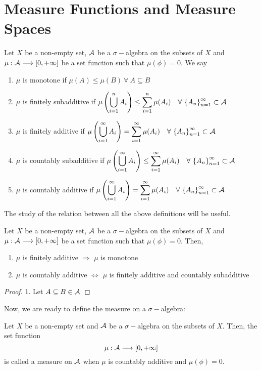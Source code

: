 \documentclass[a4paper]{book}
\begin{document}
\section{Measure Functions and Measure Spaces}
\begin{definition}
Let $X$ be a non-empty set, $\mathcal{A}$ be a $\sigma-$algebra on the subsets of $X$ and $\mu: \mathcal{A} \longrightarrow [0, +\infty]$ be a set function such that $\mu(\phi) = 0$. We say
\begin{enumerate}
\item $\displaystyle \mu$ is monotone if $\mu(A) \leq \mu(B)\ \forall\ A \subseteq B$
\item $\mu$ is finitely subadditive if $\displaystyle \mu \left( \bigcup_{i=1}^n A_i \right) \leq \sum_{i=1}^n \mu(A_i)\quad \forall\ \qty{A_n}_{n=1}^\infty \subset \mathcal{A}$
\item $\mu$ is finitely additive if $\displaystyle \mu \left( \bigcup_{i=1}^\infty A_i \right) = \sum_{i=1}^\infty \mu(A_i)\quad \forall\ \qty{A_n}_{n=1}^\infty \subset \mathcal{A}$
\item $\mu$ is countably subadditive if $\displaystyle \mu \left( \bigcup_{i=1}^\infty A_i \right) \leq \sum_{i=1}^\infty \mu(A_i)\quad \forall\ \qty{A_n}_{n=1}^\infty \subset \mathcal{A}$
\item $\mu$ is countably additive if $\displaystyle \mu \left( \bigcup_{i=1}^\infty A_i \right) = \sum_{i=1}^\infty \mu(A_i)\quad \forall\ \qty{A_n}_{n=1}^\infty \subset \mathcal{A}$
\end{enumerate}
\end{definition}
The study of the relation between all the above definitions will be useful.
\begin{theorem}
Let $X$ be a non-empty set, $\mathcal{A}$ be a $\sigma-$algebra on the subsets of $X$ and $\mu: \mathcal{A} \longrightarrow [0, +\infty]$ be a set function such that $\mu(\phi) = 0$. Then,
\begin{enumerate}
\item $\mu$ is finitely additive $\Rightarrow$ $\mu$ is monotone
\item $\mu$ is countably additive $\Leftrightarrow$ $\mu$ is finitely additive and countably subadditive
\end{enumerate}
\begin{proof}
1. Let $A \subseteq B \in \mathcal{A}$
\end{proof}
\end{theorem}
Now, we are ready to define the {measure} on a $\sigma-$algebra:
\begin{definition}
Let $X$ be a non-empty set and $\mathcal{A}$ be a $\sigma-$algebra on the subsets of $X$. Then, the set function \[\mu: \mathcal{A} \longrightarrow [0, +\infty]\] is called a measure on $\mathcal{A}$ when $\mu$ is countably additive and $\mu(\phi) = 0$.
\end{definition}
\end{document}
